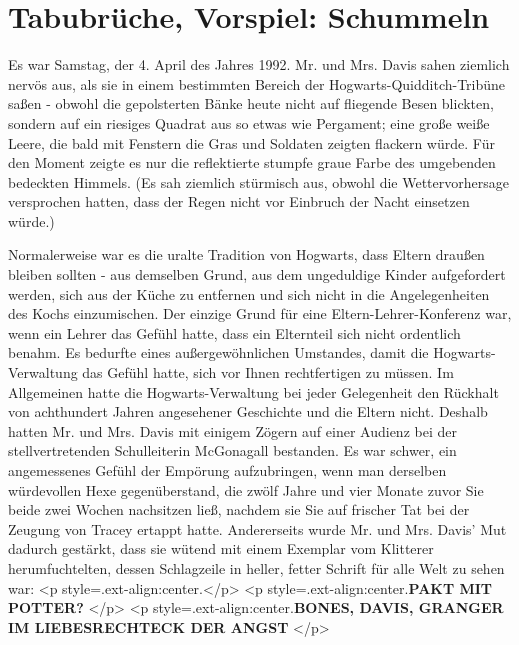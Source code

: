 \chapter{Tabubrüche, Vorspiel: Schummeln}

Es war Samstag, der 4. April des Jahres 1992. Mr. und Mrs. Davis sahen ziemlich
nervös aus, als sie in einem bestimmten Bereich der Hogwarts-Quidditch-Tribüne
saßen - obwohl die gepolsterten Bänke heute nicht auf fliegende Besen blickten,
sondern auf ein riesiges Quadrat aus so etwas wie Pergament; eine große weiße
Leere, die bald mit Fenstern die Gras und Soldaten zeigten flackern würde. Für
den Moment zeigte es nur die reflektierte stumpfe graue Farbe des umgebenden
bedeckten Himmels. (Es sah ziemlich stürmisch aus, obwohl die Wettervorhersage
versprochen hatten, dass der Regen nicht vor Einbruch der Nacht einsetzen
würde.)

Normalerweise war es die uralte Tradition von Hogwarts, dass Eltern draußen
bleiben sollten - aus demselben Grund, aus dem ungeduldige Kinder aufgefordert
werden, sich aus der Küche zu entfernen und sich nicht in die Angelegenheiten
des Kochs einzumischen. Der einzige Grund für eine Eltern-Lehrer-Konferenz war,
wenn ein Lehrer das Gefühl hatte, dass ein Elternteil sich nicht ordentlich
benahm. Es bedurfte eines außergewöhnlichen Umstandes, damit die
Hogwarts-Verwaltung das Gefühl hatte, sich vor Ihnen rechtfertigen zu müssen. Im
Allgemeinen hatte die Hogwarts-Verwaltung bei jeder Gelegenheit den Rückhalt von
achthundert Jahren angesehener Geschichte und die Eltern nicht. Deshalb hatten
Mr. und Mrs. Davis mit einigem Zögern auf einer Audienz bei der
stellvertretenden Schulleiterin McGonagall bestanden. Es war schwer, ein
angemessenes Gefühl der Empörung aufzubringen, wenn man derselben würdevollen
Hexe gegenüberstand, die zwölf Jahre und vier Monate zuvor Sie beide zwei Wochen
nachsitzen ließ, nachdem sie Sie auf frischer Tat bei der Zeugung von Tracey
ertappt hatte. Andererseits wurde Mr. und Mrs. Davis' Mut dadurch gestärkt, dass
sie wütend mit einem Exemplar vom Klitterer herumfuchtelten, dessen Schlagzeile
in heller, fetter Schrift für alle Welt zu sehen war: <p
style=\grqq{}.ext-align:center\grqq{}.</p> <p
style=\grqq{}.ext-align:center\grqq{}.\textbf{PAKT MIT POTTER? }</p> <p
style=\grqq{}.ext-align:center\grqq{}.\textbf{BONES, DAVIS, GRANGER IM
LIEBESRECHTECK DER ANGST }</p>

